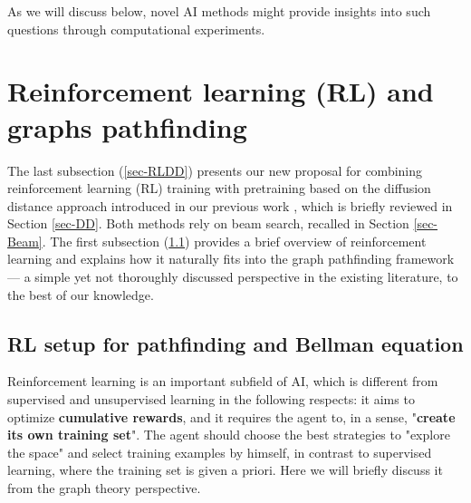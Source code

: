 \documentclass[reqno,11pt]{amsart}
\begin{document}
As we will discuss below, novel AI methods might provide insights into such questions through computational experiments.

\section{Reinforcement learning (RL) and graphs pathfinding}
The last subsection (\ref{sec-RLDD}) presents our new proposal for combining reinforcement learning (RL) training with pretraining based on the diffusion distance approach introduced in our previous work \cite{chervov2025machinelearningapproachbeats}, which is briefly reviewed in Section \ref{sec-DD}. Both methods rely on beam search, recalled in Section \ref{sec-Beam}. The first subsection (\ref{Bellman_section}) provides a brief overview of reinforcement learning and explains how it naturally fits into the graph pathfinding framework — a simple yet not thoroughly discussed 
perspective in the existing literature, to the best of our knowledge.




\subsection{RL setup for pathfinding and Bellman equation}
\label{Bellman_section}

Reinforcement learning is an important subfield
of AI, which is different from supervised and unsupervised learning in the following respects: it aims to optimize {\bf cumulative rewards}, and it requires the agent to, in a sense, "{\bf create its own training set}". The agent should choose the best strategies to "explore the space" and select training examples by himself, in contrast to supervised learning, where the training set is given a priori.
Here we will briefly discuss it from the graph theory perspective.
\end{document}
